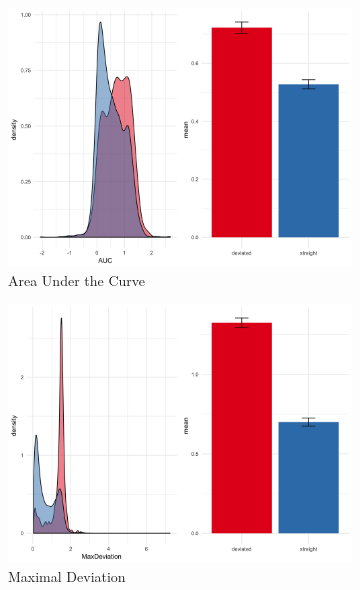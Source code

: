 \documentclass{article}
\begin{document}
\begin{itemize}
\begin{figure}
\begin{subfigure}[b]{0.45\textwidth}
\includegraphics[width=\textwidth]{AUC-calibration.png}
\caption{Area Under the Curve}
\end{subfigure}
%
\begin{subfigure}[b]{0.45\textwidth}
\includegraphics[width=\textwidth]{MaxDeviation-calibration.png}
\caption{Maximal Deviation}
\end{subfigure}
%
\begin{subfigure}[b]{0.45\textwidth}

\end{subfigure}
\end{figure}
\end{itemize}
\end{document}
